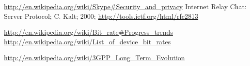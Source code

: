 \begin{thebibliography}{666}
 \url{http://en.wikipedia.org/wiki/Skype#Security_and_privacy}
 Internet Relay Chat: Server Protocol; C. Kalt; 2000;
    \url{http://tools.ietf.org/html/rfc2813}

 \url{http://en.wikipedia.org/wiki/Bit_rate#Progress_trends}
 \url{http://en.wikipedia.org/wiki/List_of_device_bit_rates}

 \url{http://en.wikipedia.org/wiki/3GPP_Long_Term_Evolution}




\end{thebibliography}
